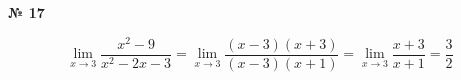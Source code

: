\documentclass{article}
\begin{document}
\textbf{№ 17} 
\large

$$ \lim\limits_{x \to 3} \frac{x^2-9}{x^2-2x-3}
= \lim\limits_{x \to 3} \frac{(x-3)(x+3)}{(x-3)(x+1)} 
= \lim\limits_{x \to 3} \frac{x+3}{x+1} 
= \frac{3}{2} $$  
\end{document}
